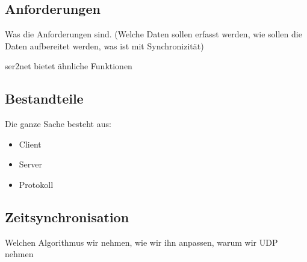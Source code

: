 \subsection{Anforderungen}
Was die Anforderungen sind. (Welche Daten sollen erfasst werden, wie sollen die
Daten aufbereitet werden, was ist mit Synchronizität)

ser2net bietet ähnliche Funktionen
\subsection{Bestandteile}
Die ganze Sache besteht aus:
\begin{itemize}
  \item Client
  \item Server
  \item Protokoll
\end{itemize}
\subsection{Zeitsynchronisation}
Welchen Algorithmus wir nehmen, wie wir ihn anpassen, warum wir UDP nehmen
